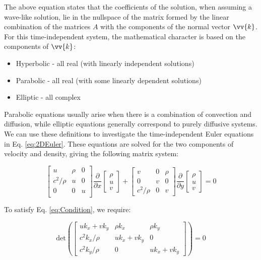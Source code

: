 \documentclass[10pt]{article}
\newcommand{\beq}{\begin{equation}}
\newcommand{\eeq}{\end{equation}}
\begin{document}
\begin{flushleft}
The above equation states that the coefficients of the solution, when assuming a wave-like solution, lie in the nullspace of the matrix formed by the linear combination of the matrices \(A\) with the components of the normal vector \(\vv{k}\). For this time-independent system, the mathematical character is based on the components of \(\vv{k}\):

\begin{itemize}
\item Hyperbolic - all real (with linearly independent solutions)
\item Parabolic - all real (with some linearly dependent solutions)
\item Elliptic - all complex
\end{itemize}

Parabolic equations usually arise when there is a combination of convection and diffusion, while elliptic equations generally correspond to purely diffusive systems. We can use these definitions to investigate the time-independent Euler equations in Eq. \eqref{eq:2DEuler}. These equations are solved for the two components of velocity and density, giving the following matrix system:

\beq
\begin{bmatrix}
u & \rho & 0\\
c^2/\rho & u & 0\\
0 & 0 & u\\
\end{bmatrix}
\frac{\partial}{\partial x}\begin{bmatrix}\rho \\ u \\ v\end{bmatrix}+
\begin{bmatrix}
v & 0 & \rho\\
0 & v & 0\\
c^2/\rho & 0 & v
\end{bmatrix}
\frac{\partial}{\partial y}\begin{bmatrix}\rho \\ u \\ v\end{bmatrix}=0
\eeq

To satisfy Eq. \eqref{eq:Condition}, we require:

\beq
\text{det}\left(\begin{bmatrix}
uk_x+vk_y & \rho k_x & \rho k_y\\
c^2k_x/\rho & uk_x+vk_y & 0\\
c^2k_y/\rho & 0 & uk_x+vk_y
\end{bmatrix}\right)=0
\eeq


\end{flushleft}
\end{document}
